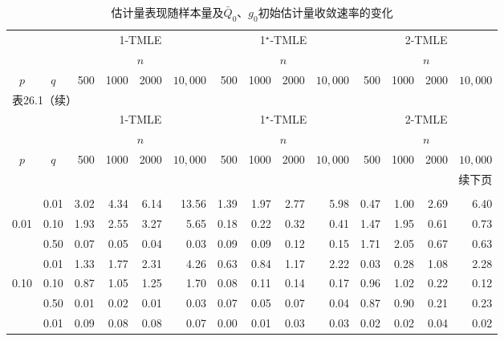 \begingroup
\footnotesize
\setlength{\tabcolsep}{3pt}
\renewcommand{\arraystretch}{1.22}
\begin{longtable}{@{}ccrrrr|rrrr|rrrr@{}}
\caption{估计量表现随样本量及$\bar Q_0$、$g_0$初始估计量收敛速率的变化}\label{tab:ch26-performance}\\
\toprule
& & \multicolumn{4}{c}{1-TMLE} & \multicolumn{4}{c}{1$^\star$-TMLE} & \multicolumn{4}{c}{2-TMLE}\\
\cmidrule(lr){3-6}\cmidrule(lr){7-10}\cmidrule(l){11-14}
& & \multicolumn{4}{c}{$n$} & \multicolumn{4}{c}{$n$} & \multicolumn{4}{c}{$n$}\\
$p$ & $q$ & 500 & 1000 & 2000 & $10{,}000$ & 500 & 1000 & 2000 & $10{,}000$ & 500 & 1000 & 2000 & $10{,}000$\\
\midrule
\endfirsthead
\multicolumn{14}{l}{\footnotesize 表26.1（续）}\\
\toprule
& & \multicolumn{4}{c}{1-TMLE} & \multicolumn{4}{c}{1$^\star$-TMLE} & \multicolumn{4}{c}{2-TMLE}\\
\cmidrule(lr){3-6}\cmidrule(lr){7-10}\cmidrule(l){11-14}
& & \multicolumn{4}{c}{$n$} & \multicolumn{4}{c}{$n$} & \multicolumn{4}{c}{$n$}\\
$p$ & $q$ & 500 & 1000 & 2000 & $10{,}000$ & 500 & 1000 & 2000 & $10{,}000$ & 500 & 1000 & 2000 & $10{,}000$\\
\midrule
\endhead
\midrule
\multicolumn{14}{r}{\footnotesize 续下页}\\
\endfoot
\bottomrule
\endlastfoot
\multicolumn{14}{l}{\textbf{$n^{1/2}|\text{偏差}|$}}\\*
 & 0.01 & 3.02 & 4.34 & 6.14 & 13.56 & 1.39 & 1.97 & 2.77 & 5.98 & 0.47 & 1.00 & 2.69 & 6.40\\*
0.01 & 0.10 & 1.93 & 2.55 & 3.27 & 5.65 & 0.18 & 0.22 & 0.32 & 0.41 & 1.47 & 1.95 & 0.61 & 0.73\\*
 & 0.50 & 0.07 & 0.05 & 0.04 & 0.03 & 0.09 & 0.09 & 0.12 & 0.15 & 1.71 & 2.05 & 0.67 & 0.63\\*
\cmidrule(l){1-14}
 & 0.01 & 1.33 & 1.77 & 2.31 & 4.26 & 0.63 & 0.84 & 1.17 & 2.22 & 0.03 & 0.28 & 1.08 & 2.28\\*
0.10 & 0.10 & 0.87 & 1.05 & 1.25 & 1.70 & 0.08 & 0.11 & 0.14 & 0.17 & 0.96 & 1.02 & 0.22 & 0.12\\*
 & 0.50 & 0.01 & 0.02 & 0.01 & 0.03 & 0.07 & 0.05 & 0.07 & 0.04 & 0.87 & 0.90 & 0.21 & 0.23\\*
\cmidrule(l){1-14}
 & 0.01 & 0.09 & 0.08 & 0.08 & 0.07 & 0.00 & 0.01 & 0.03 & 0.03 & 0.02 & 0.02 & 0.04 & 0.02\\*

\end{longtable}
